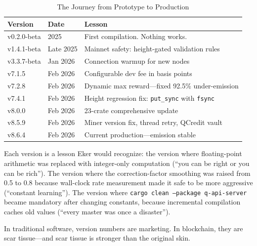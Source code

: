\documentclass[11pt,a4paper]{article}
\begin{document}
\begin{table}[H]
\centering
\caption{The Journey from Prototype to Production}
\begin{tabular}{@{}llp{7cm}@{}}
\toprule
\textbf{Version} & \textbf{Date} & \textbf{Lesson} \\
\midrule
v0.2.0-beta  & 2025    & First compilation. Nothing works. \\
v1.4.1-beta  & Late 2025 & Mainnet safety: height-gated validation rules \\
v3.3.7-beta  & Jan 2026  & Connection warmup for new nodes \\
v7.1.5       & Feb 2026  & Configurable dev fee in basis points \\
v7.2.8       & Feb 2026  & Dynamic max reward---fixed 92.5\% under-emission \\
v7.4.1       & Feb 2026  & Height regression fix: \texttt{put\_sync} with \texttt{fsync} \\
v8.0.0       & Feb 2026  & 23-crate comprehensive update \\
v8.5.9       & Feb 2026  & Miner version fix, thread retry, QCredit vault \\
v8.6.4       & Feb 2026  & Current production---emission stable \\
\bottomrule
\end{tabular}
\end{table}

Each version is a lesson Eker would recognize: the version where
floating-point arithmetic was replaced with integer-only computation
(``you can be right or you can be rich''). The version where the
correction-factor smoothing was raised from 0.5 to 0.8 because
wall-clock rate measurement made it safe to be more aggressive
(``constant learning''). The version where
\texttt{cargo clean --package q-api-server} became mandatory after
changing constants, because incremental compilation caches old values
(``every master was once a disaster'').

In traditional software, version numbers are marketing. In blockchain,
they are scar tissue---and scar tissue is stronger than the original
skin.
\end{document}
